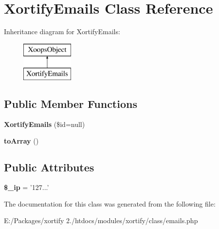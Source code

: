 \hypertarget{class_xortify_emails}{\section{Xortify\-Emails Class Reference}
\label{class_xortify_emails}
}
Inheritance diagram for Xortify\-Emails\-:\begin{figure}[H]
\begin{center}
\leavevmode
\includegraphics[height=2.000000cm]{class_xortify_emails}
\end{center}
\end{figure}
\subsection*{Public Member Functions}
\begin{DoxyCompactItemize}
\item 
\hypertarget{class_xortify_emails_a8d7aeff292d95baf5a9317948210a3a1}{{\bfseries Xortify\-Emails} (\$id=null)}\label{class_xortify_emails_a8d7aeff292d95baf5a9317948210a3a1}

\item 
\hypertarget{class_xortify_emails_abab2bf820f27e12a05e7288a62135dfc}{{\bfseries to\-Array} ()}\label{class_xortify_emails_abab2bf820f27e12a05e7288a62135dfc}

\end{DoxyCompactItemize}
\subsection*{Public Attributes}
\begin{DoxyCompactItemize}
\item 
\hypertarget{class_xortify_emails_ad0bea48de8ce5b467524ec3fd8bdfdec}{{\bfseries \$\-\_\-ip} = '127...'}\label{class_xortify_emails_ad0bea48de8ce5b467524ec3fd8bdfdec}

\end{DoxyCompactItemize}


The documentation for this class was generated from the following file\-:\begin{DoxyCompactItemize}
\item 
E\-:/\-Packages/xortify 2./htdocs/modules/xortify/class/emails.\-php\end{DoxyCompactItemize}

